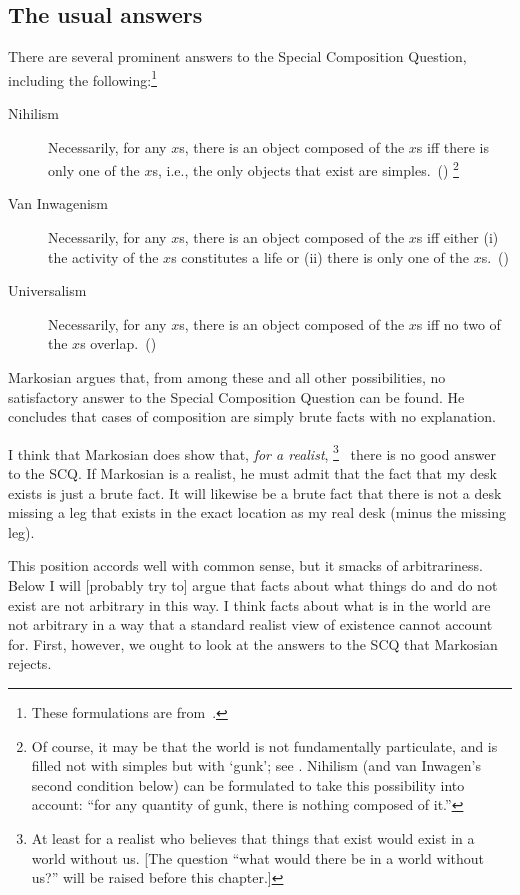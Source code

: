 \documentclass[11pt]{article}
\begin{document}
\begin{spacing}{1.5}
\subsection{The usual answers}
There are several prominent answers to the Special Composition Question, including the following:\footnote{These formulations are from~\citet{markosian1998a}.}
\begin{description}
	\item[Nihilism] Necessarily, for any $x$s, there is an object composed of the $x$s iff there is only one of the $x$s, i.e., the only objects that exist are simples.~(\citeyear[219]{markosian1998a})%
		\footnote{\label{gunk} Of course, it may be that the world is not fundamentally particulate, and is filled not with simples but with `gunk'; see \citet{schaffer2003}. Nihilism (and van Inwagen's second condition below) can be formulated to take this possibility into account: ``for any quantity of gunk, there is nothing composed of it.''}%
	\item[Van Inwagenism] Necessarily, for any $x$s, there is an object composed of the $x$s iff either (i) the activity of the $x$s constitutes a life or (ii) there is only one of the $x$s.~(\citeyear[221]{markosian1998a})
	\item[Universalism] Necessarily, for any $x$s, there is an object composed of the $x$s iff no two of the $x$s overlap.~(\citeyear[227]{markosian1998a})
\end{description}

Markosian argues that, from among these and all other possibilities, no satisfactory answer to the Special Composition Question can be found. He concludes that cases of composition are simply brute facts with no explanation.%

I think that Markosian does show that, {\em for a realist},%
\footnote{At least for a realist who believes that things that exist would exist in a world without us. [The question ``what would there be in a world without us?'' will be raised before this chapter.]}%
%
\ there is no good answer to the SCQ. If Markosian is a realist, he must admit that the fact that my desk exists is just a brute fact. It will likewise be a brute fact that there is not a desk missing a leg that exists in the exact location as my real desk (minus the missing leg).

This position accords well with common sense, but it smacks of arbitrariness. Below I will [probably try to] argue that facts about what things do and do not exist are not arbitrary in this way. I think facts about what is in the world are not arbitrary in a way that a standard realist view of existence cannot account for. First, however, we ought to look at the answers to the SCQ that Markosian rejects.


\end{spacing}
\end{document}
